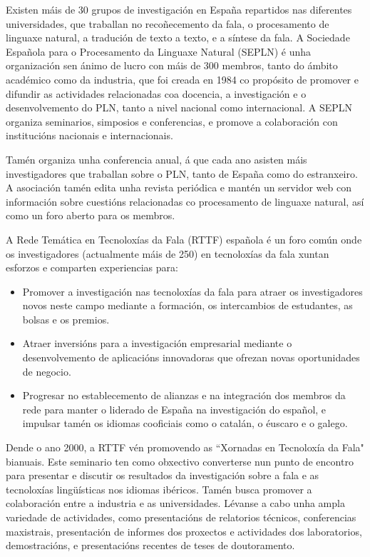 \begin{multicols}{2}
Existen máis de 30 grupos de investigación en España repartidos nas diferentes universidades, que traballan no recoñecemento da fala, o procesamento de linguaxe natural, a tradución de texto a texto, e a síntese da fala. A Sociedade Española para o Procesamento da Linguaxe Natural (SEPLN) é unha organización sen ánimo de lucro con máis de 300 membros, tanto do ámbito académico como da industria, que foi creada en 1984 co propósito de promover e difundir as actividades relacionadas coa docencia, a investigación e o desenvolvemento do PLN, tanto a nivel nacional como internacional. A SEPLN organiza seminarios, simposios e conferencias, e promove a colaboración con institucións nacionais e internacionais.


Tamén organiza unha conferencia anual, á que cada ano asisten máis investigadores que traballan sobre o PLN, tanto de España como do estranxeiro. A asociación tamén edita unha revista periódica e mantén un servidor web con información sobre cuestións relacionadas co procesamento de linguaxe natural, así como un foro aberto para os membros.

A Rede Temática en Tecnoloxías da Fala (RTTF) española \cite{GAL-Nota34} é un foro común onde os investigadores (actualmente máis de 250) en tecnoloxías da fala xuntan esforzos e comparten experiencias para:

\begin{itemize}
	\item Promover a investigación nas tecnoloxías da fala para atraer os investigadores novos neste campo mediante a formación, os intercambios de estudantes, as bolsas e os premios.
	\item Atraer inversións para a investigación empresarial mediante o desenvolvemento de aplicacións innovadoras que ofrezan novas oportunidades de negocio. 
	\item Progresar no establecemento de alianzas e na integración dos membros da rede para manter o liderado de España na investigación do español, e impulsar tamén os idiomas cooficiais como o catalán, o éuscaro e o galego.
\end{itemize}

Dende o ano 2000, a RTTF vén promovendo as “Xornadas en Tecnoloxía da Fala" bianuais. Este seminario ten como obxectivo converterse nun punto de encontro para presentar e discutir os resultados da investigación sobre a fala e as tecnoloxías lingüísticas nos idiomas ibéricos. Tamén busca promover a colaboración entre a industria e as universidades. Lévanse a cabo unha ampla variedade de actividades, como presentacións de relatorios técnicos, conferencias maxistrais, presentación de informes dos proxectos e actividades dos laboratorios, demostracións, e presentacións recentes de teses de doutoramento.


\end{multicols}
